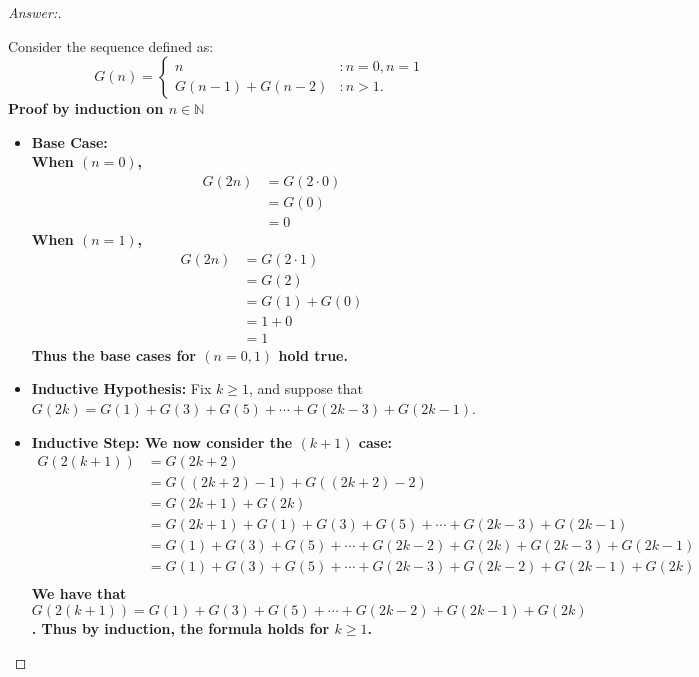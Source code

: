 \documentclass[11pt]{article}
\theoremstyle{definition}
\theoremstyle{definition}
\theoremstyle{definition}
\begin{document}
\begin{proof}[Answer:] \
\item Consider the sequence defined as:
\[
G(n) = \begin{cases} n & : n = 0, n = 1 \\
G(n - 1) + G(n - 2) & : n > 1.
\end{cases}
\]
\textbf{Proof by induction on $n \in \mathbb{N}$}
\begin{itemize}
\item \textbf{Base Case:}
\\ \hspace*{20mm} \textbf{When $(n = 0)$,}
\begin{align*}
G(2n) &= G(2 \cdot 0) \\
&= G(0) \\
&= 0
\end{align*}
\hspace*{20mm} \textbf{When $(n = 1)$,}
\begin{align*}
G(2n) &= G(2 \cdot 1) \\
&= G(2) \\
&= G(1) + G(0) \\
&= 1 + 0 \\
&= 1
\end{align*}
\textbf{Thus the base cases for $(n=0,1)$ hold true.}
\item \textbf{Inductive Hypothesis:} Fix $k \geq 1$, and suppose that $G(2k) = G(1) + G(3) + G(5) + \cdots + G(2k-3) + G(2k-1)$.
\item \textbf{Inductive Step: We now consider the $(k+1)$ case:}
\begin{align*}
G(2(k + 1)) &= G(2k + 2) \\
&= G((2k + 2) - 1) + G((2k + 2) - 2) \\
&= G(2k + 1) + G(2k) \\
&= G(2k + 1) + G(1) + G(3) + G(5) + \cdots + G(2k - 3) + G(2k - 1) \\
&= G(1) + G(3) + G(5) + \cdots + G(2k - 2) + G(2k) + G(2k - 3) + G(2k - 1) \\
&= G(1) + G(3) + G(5) + \cdots + G(2k - 3) + G(2k - 2) + G(2k - 1) + G(2k) \\
\end{align*}
\textbf{We have that $G(2(k + 1)) = G(1) + G(3) + G(5) + \cdots + G(2k - 2) + G(2k - 1) + G(2k)$. Thus by induction, the formula holds for $k \geq 1$.}
\end{itemize}

\end{proof}

\end{document}
